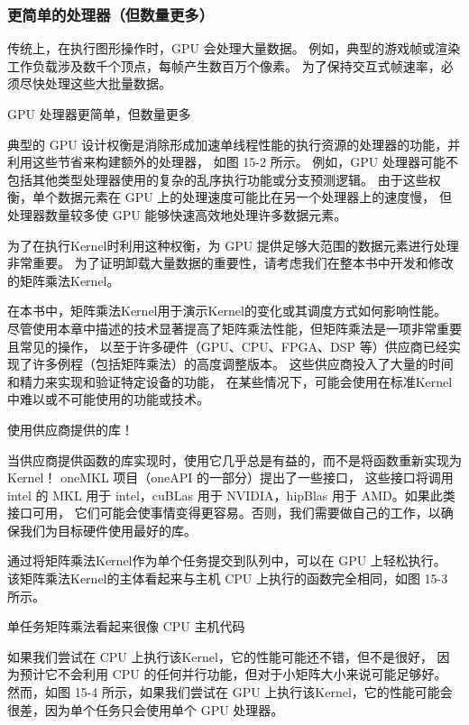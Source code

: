 \subsubsection{更简单的处理器（但数量更多）}
传统上，在执行图形操作时，GPU 会处理大量数据。 
例如，典型的游戏帧或渲染工作负载涉及数千个顶点，每帧产生数百万个像素。 
为了保持交互式帧速率，必须尽快处理这些大批量数据。

{\color{red} GPU 处理器更简单，但数量更多}

典型的 GPU 设计权衡是消除形成加速单线程性能的执行资源的处理器的功能，并利用这些节省来构建额外的处理器，
如图 15-2 所示。 例如，GPU 处理器可能不包括其他类型处理器使用的复杂的乱序执行功能或分支预测逻辑。 
由于这些权衡，单个数据元素在 GPU 上的处理速度可能比在另一个处理器上的速度慢，
但处理器数量较多使 GPU 能够快速高效地处理许多数据元素。

为了在执行Kernel时利用这种权衡，为 GPU 提供足够大范围的数据元素进行处理非常重要。 
为了证明卸载大量数据的重要性，请考虑我们在整本书中开发和修改的矩阵乘法Kernel。

\begin{remark}[关于矩阵乘法的提醒]
	在本书中，矩阵乘法Kernel用于演示Kernel的变化或其调度方式如何影响性能。
	尽管使用本章中描述的技术显著提高了矩阵乘法性能，但矩阵乘法是一项非常重要且常见的操作，
	以至于许多硬件（GPU、CPU、FPGA、DSP 等）供应商已经实现了许多例程（包括矩阵乘法）的高度调整版本。
	这些供应商投入了大量的时间和精力来实现和验证特定设备的功能，
	在某些情况下，可能会使用在标准Kernel中难以或不可能使用的功能或技术。

使用供应商提供的库！

当供应商提供函数的库实现时，使用它几乎总是有益的，而不是将函数重新实现为Kernel！
oneMKL 项目（oneAPI 的一部分）提出了一些接口，
这些接口将调用 intel 的 MKL 用于 intel，cuBLas 用于 NVIDIA，hipBlas 用于 AMD。如果此类接口可用，
它们可能会使事情变得更容易。否则，我们需要做自己的工作，以确保我们为目标硬件使用最好的库。
\end{remark}

通过将矩阵乘法Kernel作为单个任务提交到队列中，可以在 GPU 上轻松执行。 
该矩阵乘法Kernel的主体看起来与主机 CPU 上执行的函数完全相同，如图 15-3 所示。

{\color{red} 单任务矩阵乘法看起来很像 CPU 主机代码}

如果我们尝试在 CPU 上执行该Kernel，它的性能可能还不错，但不是很好，
因为预计它不会利用 CPU 的任何并行功能，但对于小矩阵大小来说可能足够好。 
然而，如图 15-4 所示，如果我们尝试在 GPU 上执行该Kernel，它的性能可能会很差，因为单个任务只会使用单个 GPU 处理器。


